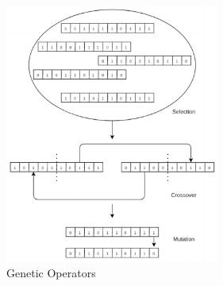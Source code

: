 \documentclass[conference]{IEEEtran}
\begin{document}
\begin{figure}[!t]
\centering\includegraphics[width=7cm]{p2.png}
\caption{Genetic Operators}
\label{p3}
\end{figure}
\end{document}
